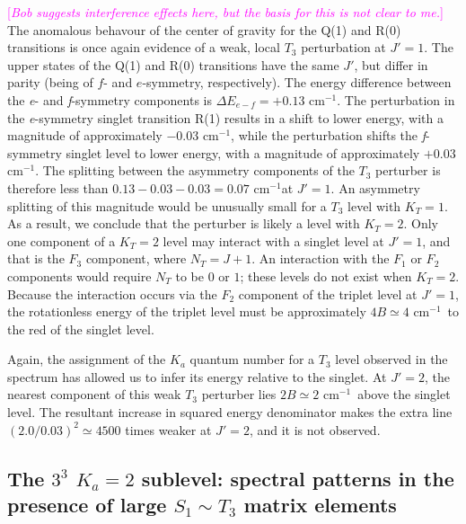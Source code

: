 \documentclass[12pt]{mitthesis}
\newcommand{\NOTE} [1]{\textcolor{magenta}{[\emph{#1}]}}
\newcommand{\rcm}{cm$^{-1}$}
\newcommand{\Ka}[1]{$K_a\!\!=\!#1$}
\begin{document}
\NOTE{Bob suggests interference effects here, but the basis for this
  is not clear to me.} The anomalous behavour of the center of gravity
for the Q(1) and R(0) transitions is once again evidence of a weak,
local $T_3$ perturbation at $J'=1$.  The upper states of the Q(1) and
R(0) transitions have the same $J'$, but differ in parity (being of
$f$- and $e$-symmetry, respectively).  The energy difference between
the \emph{e}- and \emph{f}-symmetry components is $\Delta
E_{e-f}=+0.13$ \rcm.  The perturbation in the \emph{e}-symmetry
singlet transition R(1) results in a shift to lower energy, with a
magnitude of approximately $-0.03$ \rcm, while the perturbation shifts the
\emph{f}-symmetry singlet level to lower energy, with a magnitude
of approximately $+0.03$ \rcm.  The splitting between the asymmetry
components of the $T_3$ perturber is therefore less than
$0.13-0.03-0.03=0.07$ \rcm at $J'=1$.  An asymmetry splitting of this
magnitude would be unusually small for a $T_3$ level with $K_T=1$.  As
a result, we conclude that the perturber is likely a level with
$K_T=2$.  Only one component of a $K_T=2$ level may interact with a
singlet level at $J'=1$, and that is the $F_3$ component, where
$N_T=J+1$.  An interaction with the $F_1$ or $F_2$ components would
require $N_T$ to be $0$ or $1$; these levels do not exist when
$K_T=2$.  Because the interaction occurs via the $F_2$ component of
the triplet level at $J'=1$, the rotationless energy of the triplet
level must be approximately $4B \simeq 4$ \rcm\ to the red of the
singlet level.

Again, the assignment of the $K_a$ quantum number for a $T_3$ level
observed in the spectrum has allowed us to infer its energy relative
to the singlet.  At $J'=2$, the nearest component of this weak $T_3$
perturber lies $2B \simeq 2$ \rcm\ above the singlet level.  The
resultant increase in squared energy denominator makes the
extra line $(2.0/0.03)^2 \simeq 4500$ times weaker at $J'=2$, and it
is not observed.

%
% 











\subsection{The $3^3$ \Ka{2} sublevel: spectral patterns in the
  presence of large $S_1 \sim T_3$ matrix elements}
\end{document}
